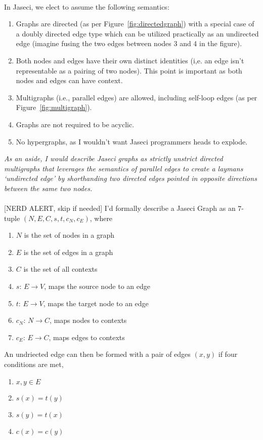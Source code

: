 \documentclass{book}
\begin{document}
\paragraph{}
\printfigGraphTypes
In Jaseci, we elect to assume the following semantics:
\begin{enumerate}
    \item Graphs are directed (as per Figure~\ref{fig:directedgraph}) with a special case of a doubly directed edge type which can be utilized practically as an undirected edge (imagine fusing the two edges between nodes 3 and 4 in the figure).
    \item Both nodes and edges have their own distinct identities (i,e. an edge isn't representable as a pairing of two nodes). This point is important as both nodes and edges can have context.
    \item Multigraphs (i.e., parallel edges) are allowed, including self-loop edges (as per Figure~\ref{fig:multigraph}).
    \item Graphs are not required to be acyclic.
    \item No hypergraphs, as I wouldn't want Jaseci programmers heads to explode.

\end{enumerate}
\emph{As an aside, I would describe Jaseci graphs as strictly unstrict directed multigraphs that leverages the semantics of parallel edges to create a laymans `undirected edge' by shorthanding two directed edges pointed in opposite directions between the same two nodes.}
\paragraph{}

[NERD ALERT, skip if needed]
\noindent I'd formally describe a Jaseci Graph as an $7$-tuple $(N,E,C,s,t,c_N,c_E)$, where
\begin{enumerate}
    \item $N$ is the set of nodes in a graph
    \item $E$ is the set of edges in a graph
    \item $C$ is the set of all contexts
    \item $s$: $E \rightarrow V$, maps the source node to an edge
    \item $t$: $E \rightarrow V$,  maps the target node to an edge
    \item $c_N$: $N \rightarrow C$, maps nodes to contexts
    \item $c_E$: $E \rightarrow C$, maps edges to contexts
\end{enumerate}
An undriected edge can then be formed with a pair of edges $(x, y)$ if four conditions are met,
\begin{enumerate}
    \item $x, y \in E$
    \item $s(x) = t(y)$
    \item $s(y) = t(x)$
    \item $c(x) = c(y)$
\end{enumerate}
\end{document}
